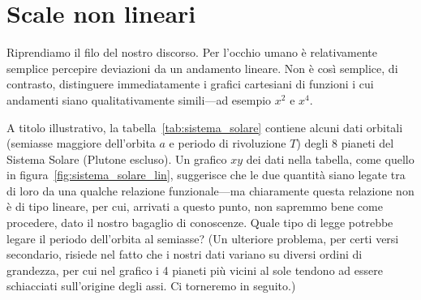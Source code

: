 \section{Scale non lineari}
\label{sec:non_lin_scales}

Riprendiamo il filo del nostro discorso. Per l'occhio umano è relativamente
semplice percepire deviazioni da un andamento lineare. Non è così semplice,
di contrasto, distinguere immediatamente i grafici cartesiani di funzioni i cui
andamenti siano qualitativamente simili---ad esempio $x^2$ e $x^4$.

\begin{table}[!htb]
\end{table}

A titolo illustrativo, la tabella~\ref{tab:sistema_solare} contiene alcuni dati
orbitali (semiasse maggiore dell'orbita $a$ e periodo di rivoluzione $T$) degli
8 pianeti del Sistema Solare (Plutone escluso). Un grafico $xy$ dei dati nella
tabella, come quello in figura~\ref{fig:sistema_solare_lin}, suggerisce che le
due quantità siano legate tra di loro da una qualche relazione funzionale---ma
chiaramente questa relazione non è di tipo lineare, per cui, arrivati a
questo punto, non sapremmo bene come procedere, dato il nostro bagaglio di
conoscenze. Quale tipo di legge potrebbe legare il periodo dell'orbita al
semiasse?
(Un ulteriore problema, per certi versi secondario, risiede nel fatto che i
nostri dati variano su diversi ordini di grandezza, per cui nel grafico i 4
pianeti più vicini al sole tendono ad essere schiacciati sull'origine
degli assi. Ci torneremo in seguito.)

